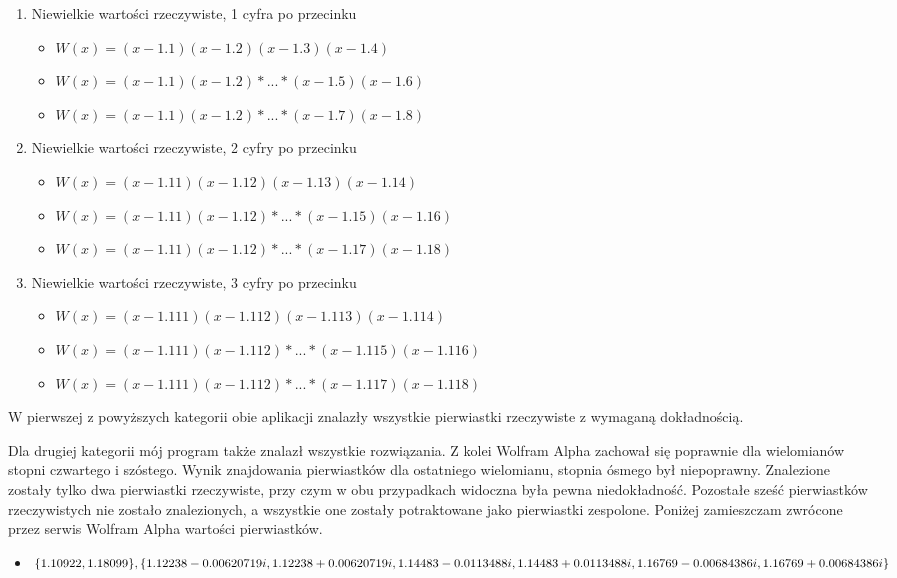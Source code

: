\begin{enumerate}
	\item Niewielkie wartości rzeczywiste, 1 cyfra po przecinku
	\begin{itemize}
		\item $W(x)=(x-1.1)(x-1.2)(x-1.3)(x-1.4)$
		\item $W(x)=(x-1.1)(x-1.2)*...*(x-1.5)(x-1.6)$
		\item $W(x)=(x-1.1)(x-1.2)*...*(x-1.7)(x-1.8)$
	\end{itemize}
	\item Niewielkie wartości rzeczywiste, 2 cyfry po przecinku
	\begin{itemize}
		\item $W(x)=(x-1.11)(x-1.12)(x-1.13)(x-1.14)$
		\item $W(x)=(x-1.11)(x-1.12)*...*(x-1.15)(x-1.16)$
		\item $W(x)=(x-1.11)(x-1.12)*...*(x-1.17)(x-1.18)$
	\end{itemize}
	\item Niewielkie wartości rzeczywiste, 3 cyfry po przecinku
	\begin{itemize}
		\item $W(x)=(x-1.111)(x-1.112)(x-1.113)(x-1.114)$
		\item $W(x)=(x-1.111)(x-1.112)*...*(x-1.115)(x-1.116)$
		\item $W(x)=(x-1.111)(x-1.112)*...*(x-1.117)(x-1.118)$
	\end{itemize}
\end{enumerate}

W pierwszej z powyższych kategorii obie aplikacji znalazły wszystkie pierwiastki rzeczywiste z wymaganą dokładnością.

Dla drugiej kategorii mój program także znalazł wszystkie rozwiązania. Z kolei Wolfram Alpha zachował się poprawnie dla wielomianów stopni czwartego i szóstego. Wynik znajdowania pierwiastków dla ostatniego wielomianu, stopnia ósmego był niepoprawny. Znalezione zostały tylko dwa pierwiastki rzeczywiste, przy czym w obu przypadkach widoczna była pewna niedokładność. Pozostałe sześć pierwiastków rzeczywistych nie zostało znalezionych, a wszystkie one zostały potraktowane jako pierwiastki zespolone. Poniżej zamieszczam zwrócone przez serwis Wolfram Alpha wartości pierwiastków.

\begin{itemize}
	\item $\{1.10922, 1.18099\}, \{1.12238-0.00620719i, 1.12238+0.00620719i, \\
	1.14483-0.0113488i, 1.14483+0.0113488i, 1.16769-0.00684386 i, 1.16769+0.00684386i\}$
\end{itemize}

